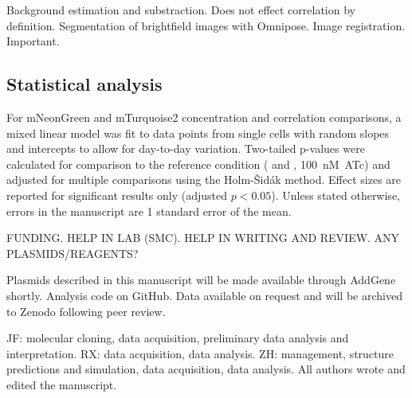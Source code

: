 \documentclass[pdflatex,sn-basic]{sn-jnl}%
\begin{document}
Background estimation and substraction. Does not effect correlation by definition.
Segmentation of brightfield images with Omnipose.
Image registration. Important.

\loremipsum{} 

\subsection{Statistical analysis}

For mNeonGreen and mTurquoise2 concentration and correlation comparisons, a mixed linear model was fit to data points from single cells with random slopes and intercepts to allow for day-to-day variation. Two-tailed p-values were calculated for comparison to the reference condition (\permN{} and \ftsbdLQ{}, 100~nM~ATc) and adjusted for multiple comparisons using the Holm-Šidák method. Effect sizes are reported for significant results only (adjusted $p<0.05$). Unless stated otherwise, errors in the manuscript are 1 standard error of the mean.

\loremipsum{}

\backmatter


FUNDING. HELP IN LAB (SMC). HELP IN WRITING AND REVIEW. ANY PLASMIDS/REAGENTS?

Plasmids described in this manuscript will be made available through AddGene shortly.
Analysis code on GitHub.
Data available on request and will be archived to Zenodo following peer review.


JF: molecular cloning, data acquisition, preliminary data analysis and interpretation. RX: data acquisition, data analysis. ZH: management, structure predictions and simulation, data acquisition, data analysis. All authors wrote and edited the manuscript.

\end{document}
